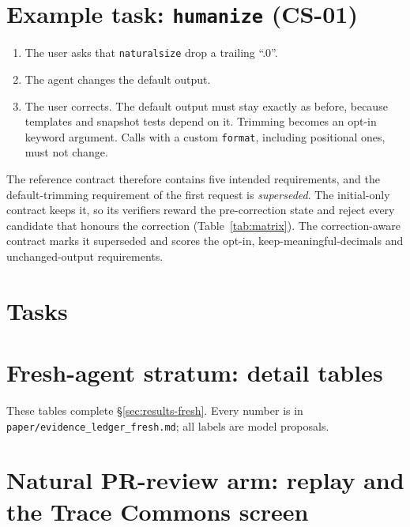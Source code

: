 \section{Example task: \texttt{humanize} (CS-01)}
\begin{enumerate}
\item The user asks that \texttt{naturalsize} drop a trailing ``.0''.
\item The agent changes the default output.
\item The user corrects. The default output must stay exactly as before, because templates and snapshot tests depend on it. Trimming becomes an opt-in keyword argument. Calls with a custom \texttt{format}, including positional ones, must not change.
\end{enumerate}
The reference contract therefore contains five intended requirements, and the default-trimming requirement of the first request is \emph{superseded}. The initial-only contract keeps it, so its verifiers reward the pre-correction state and reject every candidate that honours the correction (Table~\ref{tab:matrix}). The correction-aware contract marks it superseded and scores the opt-in, keep-meaningful-decimals and unchanged-output requirements.


\section{Tasks}

\section{Fresh-agent stratum: detail tables}
\label{app:fresh}
These tables complete \S\ref{sec:results-fresh}. Every number is in \texttt{paper/evidence\_ledger\_fresh.md}; all labels are model proposals.
\clearpage
{}

\section{Natural PR-review arm: replay and the Trace Commons screen}
\label{app:natural}
